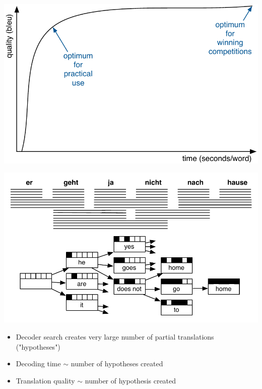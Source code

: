 \documentclass[landscape]{uedslides2C}
\begin{document}

\vspace{5mm}
\begin{center} 
\includegraphics[scale=1.4]{quality-vs-speed.pdf}\vspace{-20mm}
\end{center}


\begin{center} 
\includegraphics[scale=0.95]{decoding-step5.pdf}
\end{center}
\begin{itemize} \itemsep -1mm
\item Decoder search creates very large number of partial translations ("hypotheses")
\item Decoding time $\sim$ number of hypotheses created
\item Translation quality $\sim$ number of hypothesis created
\end{itemize}
\end{document}
